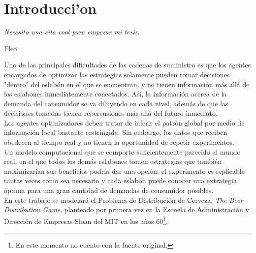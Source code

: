 \chapter{Introducci'on}

\textit{Necesito una cita cool para empezar mi tesis.}
\begin{flushright}
 Fleo
 \end{flushright}

\vspace{10 pt}





Uno de las principales dificultades de las cadenas de suministro es que los agentes encargados de optimizar las estrategias solamente pueden tomar decisiones "dentro" del eslabón en el que se encuentran, y no tienen información más allá de los eslabones inmediatemente conectados. Así, la información acerca de la demanda del consumidor se va diluyendo en cada nivel, además de que las decisiones tomadas tienen repercusiones más allá del futuro inmediato. \\

Los agentes optimizadores deben tratar de inferir el patrón global por medio de información local bastante restringida. Sin embargo, los datos que reciben obedecen al tiempo real y no tienen la oportunidad de repetir experimentos.\\

Un modelo computacional que se comporte suficientemente parecido al mundo real, en el que todos los demás eslabones tomen estrategias que también maximizarían sus beneficios podría dar una opción: el experimento es replicable tantas veces como sea necesario y cada eslabón puede conocer una extrategia óptima para una gran cantidad de demandas de consumidor posibles.\\

En este trabajo se modelará el Problema de Distribución de Cerveza, \textit{The Beer Distribution Game}, planteado por primera vez en la Escuela de Administraci\'on y Direcci\'on de Empresas Sloan del MIT en los años 60\footnote{En este momento no cuento con la fuente original.}, \\



